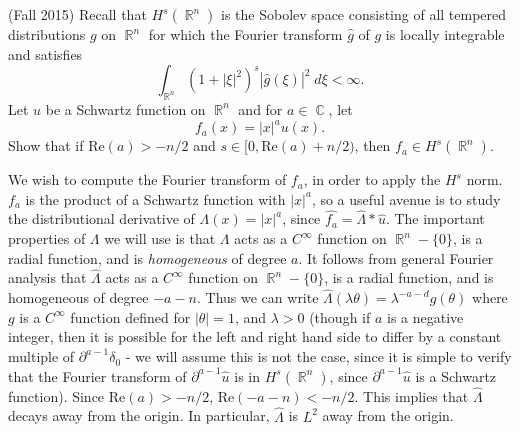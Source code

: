 \documentclass[answers]{exam}
\DeclareMathOperator{\CC}{\mathbb{C}}
\DeclareMathOperator{\RR}{\mathbb{R}}
\begin{document}
\begin{questions}
\question (Fall 2015) Recall that $H^s(\RR^n)$ is the Sobolev space consisting of all tempered distributions $g$ on $\RR^n$ for which the Fourier transform $\widehat{g}$ of $g$ is locally integrable and satisfies
%
\[ \int_{\RR^n} (1 + |\xi|^2)^s |\widehat{g}(\xi)|^2\; d\xi < \infty. \]
%
Let $u$ be a Schwartz function on $\RR^n$ and for $a \in \CC$, let
%
\[ f_a(x) = |x|^a u(x). \]
%
Show that if $\text{Re}(a) > - n/2$ and $s \in [0,\text{Re}(a) + n/2)$, then $f_a \in H^s(\RR^n)$.
\begin{solution}
    We wish to compute the Fourier transform of $f_a$, in order to apply the $H^s$ norm. $f_a$ is the product of a Schwartz function with $|x|^a$, so a useful avenue is to study the distributional derivative of $\Lambda(x) = |x|^a$, since $\widehat{f_a} = \widehat{\Lambda} * \widehat{u}$. The important properties of $\Lambda$ we will use is that $\Lambda$ acts as a $C^\infty$ function on $\RR^n - \{ 0 \}$, is a radial function, and is \emph{homogeneous} of degree $a$. It follows from general Fourier analysis that $\widehat{\Lambda}$ acts as a $C^\infty$ function on $\RR^n - \{ 0 \}$, is a radial function, and is homogeneous of degree $-a-n$. Thus we can write $\widehat{\Lambda}(\lambda \theta) = \lambda^{-a - d} g(\theta)$ where $g$ is a $C^\infty$ function defined for $|\theta| = 1$, and $\lambda > 0$ (though if $a$ is a negative integer, then it is possible for the left and right hand side to differ by a constant multiple of $\partial^{a-1} \delta_0$ - we will assume this is not the case, since it is simple to verify that the Fourier transform of $\partial^{a-1} \widehat{u}$ is in $H^s(\RR^n)$, since $\partial^{a-1} \widehat{u}$ is a Schwartz function). Since $\text{Re}(a) > -n/2$, $\text{Re}(-a-n) < -n/2$. This implies that $\widehat{\Lambda}$ decays away from the origin. In particular, $\widehat{\Lambda}$ is $L^2$ away from the origin.


\end{solution}
\end{questions}
\end{document}

